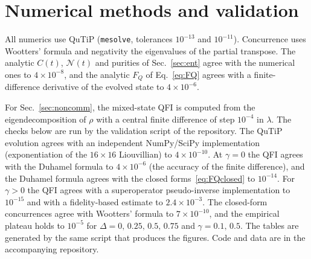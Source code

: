 \documentclass[10.5pt,a4paper]{article}
\newcommand{\FQ}{F_Q}
\newcommand{\Neg}{\mathcal N}
\begin{document}
\appendix
\section{Numerical methods and validation}\label{app:num}

All numerics use QuTiP \cite{QuTiP2012} (\texttt{mesolve}, tolerances $10^{-13}$ and $10^{-11}$). Concurrence uses Wootters' formula and negativity the eigenvalues of the partial transpose. The analytic $C(t)$, $\Neg(t)$ and purities of Sec.~\ref{sec:ent} agree with the numerical ones to $4\times10^{-8}$, and the analytic $\FQ$ of Eq.~\eqref{eq:FQ} agrees with a finite-difference derivative of the evolved state to $4\times10^{-6}$.

For Sec.~\ref{sec:noncomm}, the mixed-state QFI is computed from the eigendecomposition of $\rho$ with a central finite difference of step $10^{-4}$ in $\lambda$. The checks below are run by the validation script of the repository. The QuTiP evolution agrees with an independent NumPy/SciPy implementation (exponentiation of the $16\times16$ Liouvillian) to $4\times10^{-10}$. At $\gamma=0$ the QFI agrees with the Duhamel formula to $4\times10^{-6}$ (the accuracy of the finite difference), and the Duhamel formula agrees with the closed forms~\eqref{eq:FQclosed} to $10^{-14}$. For $\gamma>0$ the QFI agrees with a superoperator pseudo-inverse implementation to $10^{-15}$ and with a fidelity-based estimate to $2.4\times10^{-3}$. The closed-form concurrences agree with Wootters' formula to $7\times10^{-10}$, and the empirical plateau holds to $10^{-5}$ for $\Delta=0,\,0.25,\,0.5,\,0.75$ and $\gamma=0.1,\,0.5$. The tables are generated by the same script that produces the figures. Code and data are in the accompanying repository.
\end{document}
